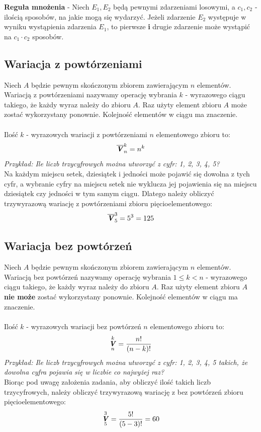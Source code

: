 \documentclass[14pt,a4paper]{extarticle}
\DeclareMathOperator{\varrep}{\textbf{\textit{V}}}
\begin{document}
\noindent\textbf{Reguła mnożenia} - Niech $E_{1}, E_{2}$ będą pewnymi zdarzeniami losowymi, a
$c_{1}, c_{2}$ - ilością sposobów, na jakie mogą się wydarzyć. Jeżeli zdarzenie $E_{2}$ występuje
w wyniku wystąpienia zdarzenia $E_{1}$, to pierwsze \textbf{i} drugie zdarzenie może wystąpić
na $c_{1}\cdot c_{2}$ sposobów.


\newpage

\subsection*{Wariacja z powtórzeniami}
\noindent Niech $A$ będzie pewnym skończonym zbiorem zawierającym $n$ elementów. 
Wariacją z powtórzeniami nazywamy operację wybrania $k$ - wyrazowego ciągu takiego, że każdy
wyraz należy do zbioru $A$. Raz użyty element zbioru $A$ może zostać wykorzystany ponownie.
Kolejność elementów w ciągu ma znaczenie.\\\\
Ilość $k$ - wyrazowych wariacji z powtórzeniami $n$ elementowego zbioru to:
\[\overline{\varrep}^{k}_{n} = n^{k}\]
\noindent\textit{Przykład: Ile liczb trzycyfrowych można utworzyć z cyfr: 1, 2, 3, 4, 5?}\\
\noindent Na każdym miejscu setek, dziesiątek i jedności może pojawić się dowolna z tych cyfr,
a wybranie cyfry na miejscu setek nie wyklucza jej pojawienia się na miejscu dziesiątek czy
jedności w tym samym ciągu. Dlatego należy obliczyć trzywyrazową wariację z powtórzeniami zbioru pięcioelementowego:
\[\overline{\varrep}^{3}_{5} = 5^{3} = 125\]

\subsection*{Wariacja bez powtórzeń}
\noindent Niech $A$ będzie pewnym skończonym zbiorem zawierającym $n$ elementów. 
Wariacją bez powtórzeń nazywamy operację wybrania $1 \leq k < n$ - wyrazowego ciągu takiego,
że każdy wyraz należy do zbioru $A$. Raz użyty element zbioru $A$ \textbf{nie może} zostać 
wykorzystany ponownie. Kolejność elementów w ciągu ma znaczenie.\\\\
Ilość $k$ - wyrazowych wariacji bez powtórzeń $n$ elementowego zbioru to:
\[\varrep^{k}_{n} = \dfrac{n!}{(n - k)!}\]
\noindent\textit{Przykład: Ile liczb trzycyfrowych można utworzyć z cyfr: 1, 2, 3, 4, 5 takich,
że dowolna cyfra pojawia się w liczbie co najwyżej raz?}\\
Biorąc pod uwagę założenia zadania, aby obliczyć ilość takich liczb trzycyfrowych, należy 
obliczyć trzywyrazową wariację z bez powtórzeń zbioru pięcioelementowego:
\[\varrep^{3}_{5} = \dfrac{5!}{(5-3)!} = 60\]
\end{document}
